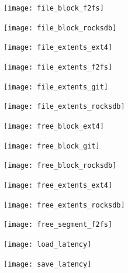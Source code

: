 \begin{figure}[t]
    \centering
	\texttt{[image: file\_block\_f2fs]}
	\caption{}
	\label{f:}
\end{figure}

\begin{figure}[t]
    \centering
	\texttt{[image: file\_block\_rocksdb]}
	\caption{}
	\label{f:}
\end{figure}

\begin{figure}[t]
    \centering
	\texttt{[image: file\_extents\_ext4]}
	\caption{}
	\label{f:}
\end{figure}

\begin{figure}[t]
    \centering
	\texttt{[image: file\_extents\_f2fs]}
	\caption{}
	\label{f:}
\end{figure}

\begin{figure}[t]
    \centering
	\texttt{[image: file\_extents\_git]}
	\caption{}
	\label{f:}
\end{figure}

\begin{figure}[t]
    \centering
	\texttt{[image: file\_extents\_rocksdb]}
	\caption{}
	\label{f:}
\end{figure}

\begin{figure}[t]
    \centering
	\texttt{[image: free\_block\_ext4]}
	\caption{}
	\label{f:}
\end{figure}

\begin{figure}[t]
    \centering
	\texttt{[image: free\_block\_git]}
	\caption{}
	\label{f:}
\end{figure}

\begin{figure}[t]
    \centering
	\texttt{[image: free\_block\_rocksdb]}
	\caption{}
	\label{f:}
\end{figure}

\begin{figure}[t]
    \centering
	\texttt{[image: free\_extents\_ext4]}
	\caption{}
	\label{f:}
\end{figure}

\begin{figure}[t]
    \centering
	\texttt{[image: free\_extents\_rocksdb]}
	\caption{}
	\label{f:}
\end{figure}

\begin{figure}[t]
    \centering
	\texttt{[image: free\_segment\_f2fs]}
	\caption{}
	\label{f:}
\end{figure}

\begin{figure}[t]
    \centering
	\texttt{[image: load\_latency]}
	\caption{}
	\label{f:}
\end{figure}

\begin{figure}[t]
    \centering
	\texttt{[image: save\_latency]}
	\caption{}
	\label{f:}
\end{figure}
